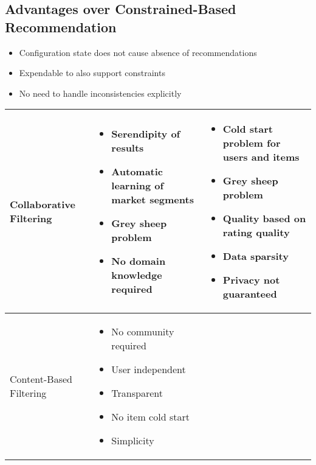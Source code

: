 \documentclass{article}
\begin{document}
\subsection{Advantages over Constrained-Based Recommendation}
\begin{itemize}
    \item Configuration state does not cause absence of recommendations
    \item Expendable to also support constraints 
    \item No need to handle inconsistencies explicitly
\end{itemize}

\begin{table}
    \begin{center}
        \begin{tabularx}{\columnwidth}{X|X|X}
            \hline
            Collaborative Filtering 
            &   \begin{itemize}
                    \item Serendipity of results 
                    \item Automatic learning of market segments
                    \item Grey sheep problem
                    \item No domain knowledge required
                \end{itemize}
            &   \begin{itemize}
                    \item Cold start problem for users and items
                    \item Grey sheep problem
                    \item Quality based on rating quality
                    \item Data sparsity
                    \item Privacy not guaranteed
                \end{itemize} \\
            \hline
            Content-Based Filtering 
            &   \begin{itemize}
                    \item No community required 
                    \item User independent
                    \item Transparent
                    \item No item cold start
                    \item Simplicity

\end{itemize}
\end{tabularx}
\end{center}
\end{table}
\end{document}
